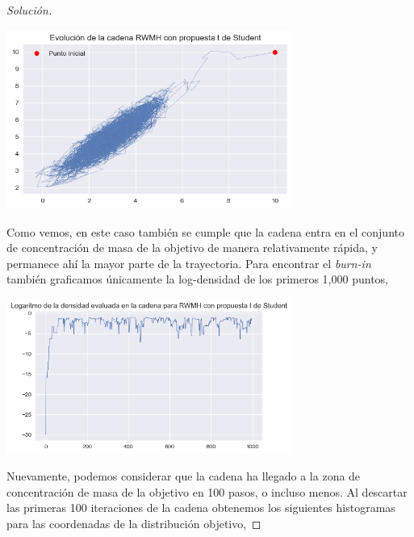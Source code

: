 \documentclass{article}
\begin{document}
\begin{enumerate}
\begin{proof}[Solución]
        \begin{center}
            \includegraphics[width=0.7\textwidth]{tarea7/trajrwt.png}
        \end{center}

        Como vemos, en este caso también se cumple que la cadena entra en el conjunto de concentración
        de masa de la objetivo de manera relativamente rápida, y permanece ahí la mayor parte de la
        trayectoria. Para encontrar el \textit{burn-in} también graficamos únicamente la log-densidad
        de los primeros 1,000 puntos,

        \begin{center}
            \includegraphics[width=0.7\textwidth]{tarea7/logdensrwt.png}
        \end{center}

        Nuevamente, podemos considerar que la cadena ha llegado a la zona de concentración de masa de la 
        objetivo en 100 pasos, o incluso menos. Al descartar las primeras 100 iteraciones de
        la cadena obtenemos los siguientes histogramas para las coordenadas de la distribución
        objetivo,


\end{proof}
\end{enumerate}
\end{document}
